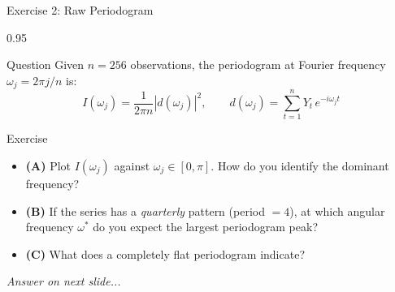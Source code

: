 \documentclass[9pt, aspectratio=169, t]{beamer}
\begin{document}
\begin{frame}{Exercise 2: Raw Periodogram}
    \begin{cminipage}{0.95\textwidth}
    \begin{alertblock}{Question}
        Given $n = 256$ observations, the periodogram at Fourier frequency $\omega_j = 2\pi j/n$ is:
        \[
            I(\omega_j) = \frac{1}{2\pi n}\left|d(\omega_j)\right|^2, \qquad
            d(\omega_j) = \sum_{t=1}^{n} Y_t\, e^{-i\omega_j t}
        \]
    \end{alertblock}

    \vspace{0.15cm}

    \begin{block}{Exercise}
        \begin{itemize}\setlength{\itemsep}{3pt}
            \item \textcolor{MainBlue}{\textbf{(A)}} Plot $I(\omega_j)$ against $\omega_j \in [0, \pi]$. How do you identify the dominant frequency?
            \item \textcolor{MainBlue}{\textbf{(B)}} If the series has a \emph{quarterly} pattern (period $= 4$), at which angular frequency $\omega^*$ do you expect the largest periodogram peak?
            \item \textcolor{MainBlue}{\textbf{(C)}} What does a completely flat periodogram indicate?
        \end{itemize}
    \end{block}

    \vspace{0.15cm}

    \begin{center}
        \textit{Answer on next slide...}
    \end{center}
    \end{cminipage}
\end{frame}
\end{document}
